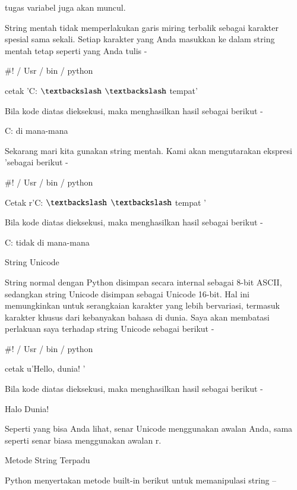 \documentclass[a4paper,12pt]{report}
\begin{document}
\noindent 
tugas variabel juga akan muncul. \par
\noindent 
String mentah tidak memperlakukan garis miring terbalik sebagai karakter spesial sama sekali. Setiap karakter yang Anda masukkan ke dalam string mentah tetap seperti yang Anda tulis - \par
\noindent 
 $  \#  $! / Usr / bin / python \par
\noindent 
\vspace{12pt}
\noindent 
cetak 'C:  $  \textbackslash  $ $  \textbackslash  $ tempat' \par
\noindent 
Bila kode diatas dieksekusi, maka menghasilkan hasil sebagai berikut - \par
\noindent 
C: di mana-mana \par
\noindent 
Sekarang mari kita gunakan string mentah. Kami akan mengutarakan ekspresi 'sebagai berikut - \par
\noindent 
 $  \#  $! / Usr / bin / python \par
\noindent 
\vspace{12pt}
\noindent 
Cetak r'C:  $  \textbackslash  $ $  \textbackslash  $ tempat ' \par
\noindent 
Bila kode diatas dieksekusi, maka menghasilkan hasil sebagai berikut - \par
\noindent 
C: tidak di mana-mana \par
\noindent 
String Unicode \par
\noindent 
String normal dengan Python disimpan secara internal sebagai 8-bit ASCII, sedangkan string Unicode disimpan sebagai Unicode 16-bit. Hal ini memungkinkan untuk serangkaian karakter yang lebih bervariasi, termasuk karakter khusus dari kebanyakan bahasa di dunia. Saya akan membatasi perlakuan saya terhadap string Unicode sebagai berikut - \par
\noindent 
 $  \#  $! / Usr / bin / python \par
\noindent 
\vspace{12pt}
\noindent 
cetak u'Hello, dunia! ' \par
\noindent 
Bila kode diatas dieksekusi, maka menghasilkan hasil sebagai berikut - \par
\noindent 
Halo Dunia! \par
\noindent 
Seperti yang bisa Anda lihat, senar Unicode menggunakan awalan Anda, sama seperti senar biasa menggunakan awalan r. \par
\noindent 
Metode String Terpadu \par
\noindent 
Python menyertakan metode built-in berikut untuk memanipulasi string – \par
\noindent 
\vspace{12pt}
\end{document}
